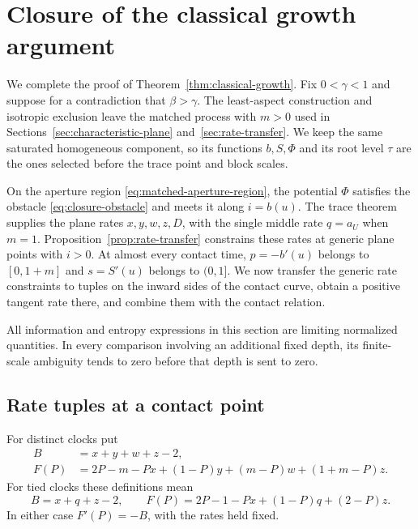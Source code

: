 \section{Closure of the classical growth argument}
\label{sec:classical-closure}

We complete the proof of Theorem~\ref{thm:classical-growth}.  Fix
$0<\gamma<1$ and suppose for a contradiction that $\beta>\gamma$.
The least-aspect construction
and isotropic exclusion leave the matched process with $m>0$ used in
Sections~\ref{sec:characteristic-plane} and~\ref{sec:rate-transfer}.
We keep the same saturated homogeneous component, so its functions
$b,S,\Phi$ and its root level $\tau$ are the ones selected before the
trace point and block scales.

On the aperture region \eqref{eq:matched-aperture-region}, the potential
$\Phi$ satisfies the obstacle \eqref{eq:closure-obstacle} and meets it
along $i=b(u)$.  The trace theorem supplies the plane rates
$x,y,w,z,D$, with the single middle rate $q=a_U$ when $m=1$.
Proposition~\ref{prop:rate-transfer} constrains these rates at generic
plane points with $i>0$.  At almost every contact time, $p=-b'(u)$ belongs to
$[0,1+m]$ and $s=S'(u)$ belongs to $(0,1]$.
We now transfer the generic rate constraints to tuples on the inward
sides of the contact curve, obtain a positive tangent rate there, and
combine them with the contact relation.

All information and entropy expressions in this section are limiting
normalized quantities.  In every comparison involving an additional
fixed depth, its finite-scale ambiguity tends to zero before that depth
is sent to zero.

\subsection{Rate tuples at a contact point}

For distinct clocks put
\begin{align}
 B&=x+y+w+z-2,\\
 F(P)&=2P-m-Px+(1-P)y+(m-P)w+(1+m-P)z.
 \label{eq:closure-F}
\end{align}
For tied clocks these definitions mean
\begin{equation}
 B=x+q+z-2,\qquad
 F(P)=2P-1-Px+(1-P)q+(2-P)z.
 \label{eq:closure-F-tied}
\end{equation}
In either case $F'(P)=-B$, with the rates held fixed.

